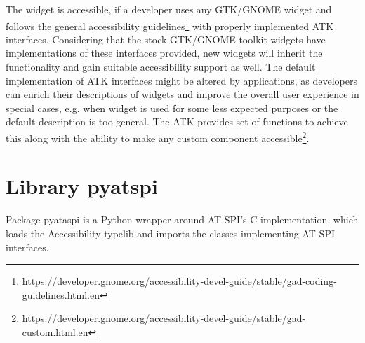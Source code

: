 The widget is accessible, if a developer uses any GTK/GNOME widget and follows the general accessibility guidelines\footnote{https://developer.gnome.org/accessibility-devel-guide/stable/gad-coding-guidelines.html.en} with properly implemented ATK interfaces. Considering that the stock GTK/GNOME toolkit widgets have implementations of these interfaces provided, new widgets will inherit the functionality and gain suitable accessibility support as well. The default implementation of ATK interfaces might be altered by applications, as developers can enrich their descriptions of widgets and improve the overall user experience in special cases, e.g. when widget is used for some less expected purposes or the default description is too general. The ATK provides set of functions to achieve this along with the ability to make any custom component accessible\footnote{https://developer.gnome.org/accessibility-devel-guide/stable/gad-custom.html.en}.\cite{accessibleWidgets}

\newpage
\section{Library pyatspi}
Package pyataspi is a Python wrapper around AT-SPI's C implementation, which loads the Accessibility typelib and imports the classes implementing AT-SPI interfaces.\cite{pyatspi}

